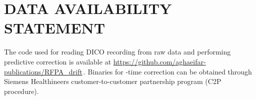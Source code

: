 

\section*{DATA AVAILABILITY STATEMENT}
The code used for reading DICO recording from raw data and performing predictive correction is available at \href{https://github.com/aghaeifar-publications/RFPA_drift}{https://github.com/aghaeifar-publications/RFPA\_drift}\,. Binaries for -time correction can be obtained through Siemens Healthineers customer-to-customer partnership program (C2P procedure).